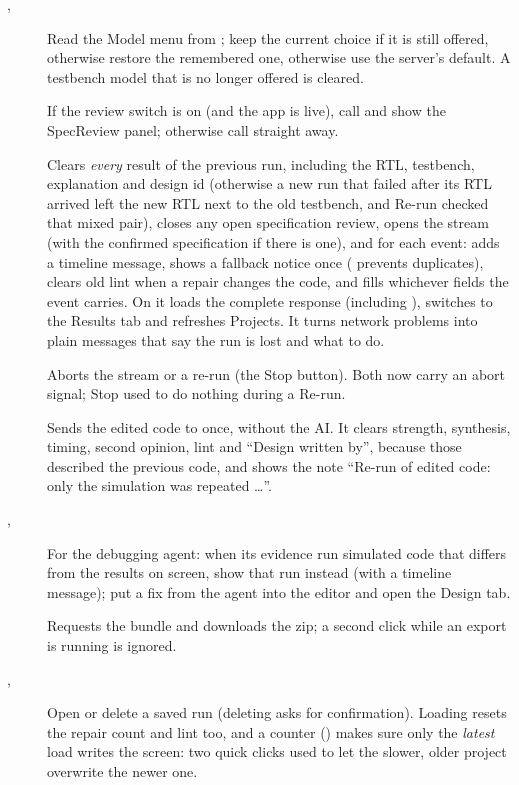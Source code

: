 \begin{description}
  \item[, ] Read the Model menu from ; keep the current choice if it is still offered, otherwise restore the remembered one, otherwise use the server's default. A testbench model that is no longer offered is cleared.
  \item[] If the review switch is on (and the app is live), call  and show the SpecReview panel; otherwise call  straight away.
  \item[] Clears \emph{every} result of the previous run, including the RTL, testbench, explanation and design id (otherwise a new run that failed after its RTL arrived left the new RTL next to the old testbench, and Re-run checked that mixed pair), closes any open specification review, opens the stream (with the confirmed specification if there is one), and for each event: adds a timeline message, shows a fallback notice once ( prevents duplicates), clears old lint when a repair changes the code, and fills whichever fields the event carries. On  it loads the complete response (including ), switches to the Results tab and refreshes Projects. It turns network problems into plain messages that say the run is lost and what to do.
  \item[] Aborts the stream or a re-run (the Stop button). Both now carry an abort signal; Stop used to do nothing during a Re-run.
  \item[] Sends the edited code to  once, without the AI. It clears strength, synthesis, timing, second opinion, lint and ``Design written by'', because those described the previous code, and shows the note ``Re-run of edited code: only the simulation was repeated \ldots''.
  \item[, ] For the debugging agent: when its evidence run simulated code that differs from the results on screen, show that run instead (with a timeline message); put a fix from the agent into the editor and open the Design tab.
  \item[] Requests the bundle and downloads the zip; a second click while an export is running is ignored.
  \item[, ] Open or delete a saved run (deleting asks for confirmation). Loading resets the repair count and lint too, and a counter () makes sure only the \emph{latest} load writes the screen: two quick clicks used to let the slower, older project overwrite the newer one.
\end{description}

